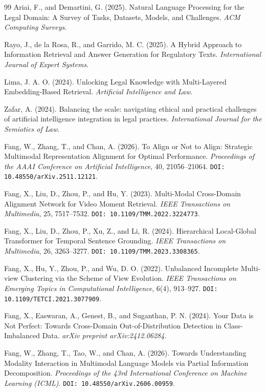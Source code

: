 \begin{thebibliography}{99}
Ariai, F., and Demartini, G. (2025).
Natural Language Processing for the Legal Domain: A Survey of Tasks, Datasets,
Models, and Challenges.
\textit{ACM Computing Surveys}.

Rayo, J., de la Rosa, R., and Garrido, M. C. (2025).
A Hybrid Approach to Information Retrieval and Answer Generation for Regulatory Texts.
\textit{International Journal of Expert Systems}.

Lima, J. A. O. (2024).
Unlocking Legal Knowledge with Multi-Layered Embedding-Based Retrieval.
\textit{Artificial Intelligence and Law}.

Zafar, A. (2024).
Balancing the scale: navigating ethical and practical challenges of artificial
intelligence integration in legal practices.
\textit{International Journal for the Semiotics of Law}.

Fang, W., Zhang, T., and Chan, A. (2026).
To Align or Not to Align: Strategic Multimodal Representation Alignment for Optimal
Performance.
\textit{Proceedings of the AAAI Conference on Artificial Intelligence}, 40, 21056--21064.
\texttt{DOI: 10.48550/arXiv.2511.12121}.

Fang, X., Liu, D., Zhou, P., and Hu, Y. (2023).
Multi-Modal Cross-Domain Alignment Network for Video Moment Retrieval.
\textit{IEEE Transactions on Multimedia}, 25, 7517--7532.
\texttt{DOI: 10.1109/TMM.2022.3224773}.

Fang, X., Liu, D., Zhou, P., Xu, Z., and Li, R. (2024).
Hierarchical Local-Global Transformer for Temporal Sentence Grounding.
\textit{IEEE Transactions on Multimedia}, 26, 3263--3277.
\texttt{DOI: 10.1109/TMM.2023.3308365}.

Fang, X., Hu, Y., Zhou, P., and Wu, D. O. (2022).
Unbalanced Incomplete Multi-view Clustering via the Scheme of View Evolution.
\textit{IEEE Transactions on Emerging Topics in Computational Intelligence}, 6(4),
913--927.
\texttt{DOI: 10.1109/TETCI.2021.3077909}.

Fang, X., Easwaran, A., Genest, B., and Suganthan, P. N. (2024).
Your Data is Not Perfect: Towards Cross-Domain Out-of-Distribution Detection in
Class-Imbalanced Data.
\textit{arXiv preprint arXiv:2412.06284}.

Fang, W., Zhang, T., Tao, W., and Chan, A. (2026).
Towards Understanding Modality Interaction in Multimodal Language Models via Partial
Information Decomposition.
\textit{Proceedings of the 43rd International Conference on Machine Learning (ICML)}.
\texttt{DOI: 10.48550/arXiv.2606.00959}.

\end{thebibliography}



